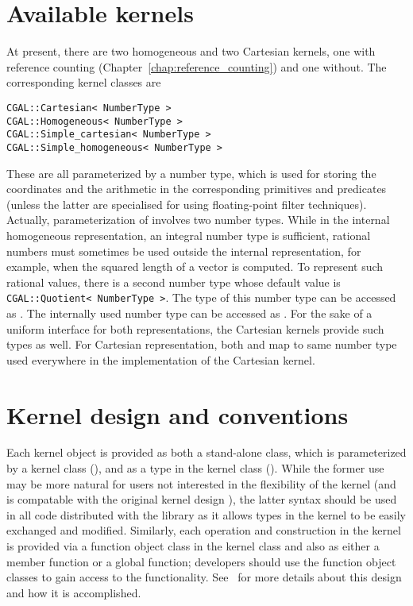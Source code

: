\section{Available kernels}
At present, there are two homogeneous and two Cartesian kernels,
one with reference counting 
(Chapter~\ref{chap:reference_counting}) and one without.
The corresponding kernel classes are
\begin{verbatim}
CGAL::Cartesian< NumberType >
CGAL::Homogeneous< NumberType >
CGAL::Simple_cartesian< NumberType >
CGAL::Simple_homogeneous< NumberType >
\end{verbatim}
%
%
%
%
These are all parameterized by a number type, which is used for storing
the coordinates and the arithmetic in the corresponding primitives and
predicates (unless the latter are specialised for using floating-point
filter techniques). Actually, parameterization of  
involves two number types. While in the internal homogeneous representation,
an integral number type is sufficient, rational numbers must sometimes be
used outside the internal representation, for example, when the squared length 
of a vector is computed. To represent such rational values, there is a second
number type whose default value is {\tt CGAL::Quotient< NumberType >}. 
The type of this number type can be accessed as .%
The internally used number type can be accessed as .%
For the sake of a uniform interface for both representations, the
Cartesian kernels provide such types as well. For Cartesian representation,
both  and  map to same number type used everywhere in the
implementation of the Cartesian kernel.  

\section{Kernel design and conventions}
%
%
Each kernel object is provided as both a stand-alone class, which is 
parameterized by a kernel class (), and as a type 
in the kernel class ().  While the former use may
be more natural for users not interested in the flexibility of the kernel
(and is compatable with the original kernel design \cite{fgkss-dccga-00}), the
latter syntax should be used in all code distributed with the library
as it allows types in the kernel to be easily exchanged and modified.
Similarly, each operation and construction in the kernel is provided via 
a function object class in the 
kernel class and also as either a member function or a global function; 
developers should use the function object classes to gain access to the
functionality.  See~\cite{hhkps-aegk-01} for more details about this 
design and how it is accomplished.

